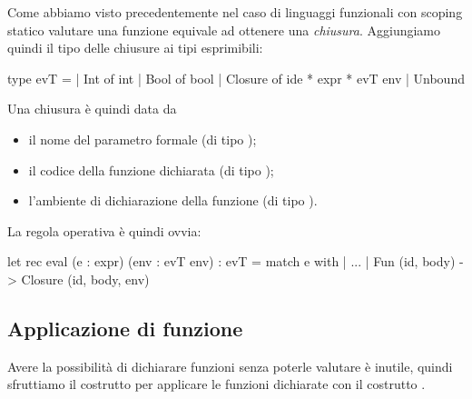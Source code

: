 Come abbiamo visto precedentemente nel caso di linguaggi funzionali con scoping statico valutare una funzione equivale ad ottenere una \emph{chiusura}. Aggiungiamo quindi il tipo delle chiusure ai tipi esprimibili:
\begin{OCaml}
type evT =
  | Int     of int
  | Bool    of bool
  | Closure of ide * expr * evT env
  | Unbound
\end{OCaml}
Una chiusura è quindi data da \begin{itemize}
    \item il nome del parametro formale (di tipo );
    \item il codice della funzione dichiarata (di tipo );
    \item l'ambiente di dichiarazione della funzione (di tipo ).
\end{itemize}

La regola operativa è quindi ovvia:
\begin{OCaml}
let rec eval (e : expr) (env : evT env) : evT =
  match e with
  | ...
  | Fun (id, body) -> Closure (id, body, env)
\end{OCaml}

\subsection*{Applicazione di funzione}

Avere la possibilità di dichiarare funzioni senza poterle valutare è inutile, quindi sfruttiamo il costrutto  per applicare le funzioni dichiarate con il costrutto .

